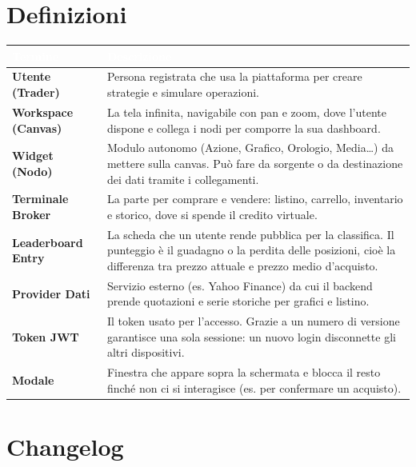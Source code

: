 \section{Definizioni}

\begin{table}[H]
\centering
{}
\renewcommand{\arraystretch}{1.3}
\begin{tabularx}{\textwidth}{|l|X|}
\hline
\rowcolor[HTML]{3B3766}
\textcolor{white}{\textbf{Termine}} & \textcolor{white}{\textbf{Descrizione}} \\ \hline
\textbf{Utente (Trader)} & Persona registrata che usa la piattaforma per creare strategie e simulare operazioni. \\ \hline
\textbf{Workspace (Canvas)} & La tela infinita, navigabile con pan e zoom, dove l'utente dispone e collega i nodi per comporre la sua dashboard. \\ \hline
\textbf{Widget (Nodo)} & Modulo autonomo (Azione, Grafico, Orologio, Media\ldots) da mettere sulla canvas. Può fare da sorgente o da destinazione dei dati tramite i collegamenti. \\ \hline
\textbf{Terminale Broker} & La parte per comprare e vendere: listino, carrello, inventario e storico, dove si spende il credito virtuale. \\ \hline
\textbf{Leaderboard Entry} & La scheda che un utente rende pubblica per la classifica. Il punteggio è il guadagno o la perdita delle posizioni, cioè la differenza tra prezzo attuale e prezzo medio d'acquisto. \\ \hline
\textbf{Provider Dati} & Servizio esterno (es. Yahoo Finance) da cui il backend prende quotazioni e serie storiche per grafici e listino. \\ \hline
\textbf{Token JWT} & Il token usato per l'accesso. Grazie a un numero di versione garantisce una sola sessione: un nuovo login disconnette gli altri dispositivi. \\ \hline
\textbf{Modale} & Finestra che appare sopra la schermata e blocca il resto finché non ci si interagisce (es. per confermare un acquisto). \\ \hline
\end{tabularx}
\end{table}

\section{Changelog}

